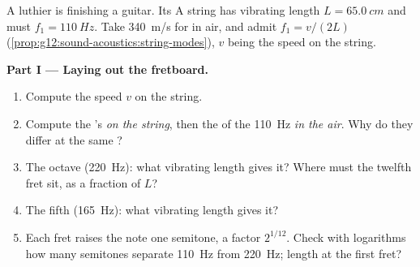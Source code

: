 \begin{problem}
\label{pb:g12:sound-acoustics:1}
A luthier is finishing a guitar. Its A string has vibrating length
$L = \qty{65.0}{cm}$ and must  $f_1 = \qty{110}{Hz}$. Take
\qty{340}{m/s} for  in air, and admit $f_1 = v/(2L)$
(\cref{prop:g12:sound-acoustics:string-modes}), $v$ being the 
speed on the string.

\medskip
\noindent\textbf{Part I --- Laying out the fretboard.}
\begin{enumerate}
  \item Compute the  speed $v$ on the string.
  \item Compute the 's  \emph{on the string},
        then the  of the \qty{110}{Hz}  \emph{in the
        air}. Why do they differ at the same ?
  \item The octave (\qty{220}{Hz}): what vibrating length gives it?
        Where must the twelfth fret sit, as a fraction of $L$?
  \item The fifth (\qty{165}{Hz}): what vibrating length gives it?
  \item Each fret raises the note one semitone, a factor
        $2^{1/12}$. Check with logarithms how many semitones separate
        \qty{110}{Hz} from \qty{220}{Hz}; length at the first fret?
\end{enumerate}


\end{problem}
